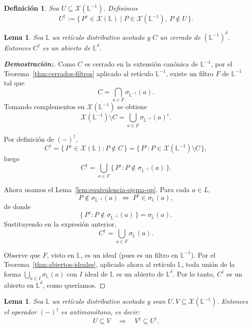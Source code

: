 \documentclass[12pt]{book}
\newtheorem{lemma}[theorem]{Lema}
\newtheorem{definition}[theorem]{Definición}
\begin{document}
\begin{definition}\label{def:operador-dagger}
Sea $U\subseteq\mathcal X(\mathbb L^{-1})$. 
Definimos
\[
U^{\dagger}
:= 
\{\,P^{c}\in\mathcal X(\mathbb L)\mid 
P\in\mathcal X(\mathbb L^{-1}),\ P\notin U\,\}.
\]
\end{definition}

\begin{lemma}
Sea $\mathbb L$ un retículo distributivo acotado y
$C$ un cerrado de $(\mathbb{L}^{-1})^\delta$.
Entonces $C^{\dagger}$ es un abierto de $\mathbb{L}^\delta$.
\end{lemma}

\begin{proof}[\textbf{Demostración:}]
Como $C$ es cerrado en la extensión canónica de $\mathbb L^{-1}$,
por el Teorema~\ref{thm:cerrados-filtros} aplicado al retículo
$\mathbb L^{-1}$, existe un filtro $F$ de $\mathbb L^{-1}$ tal que
\[
C
=
\bigcap_{a\in F}\sigma_{\mathbb L^{-1}}(a).
\]
Tomando complementos en $\mathcal X(\mathbb L^{-1})$ se obtiene
\[
\mathcal X(\mathbb L^{-1})\setminus C
=
\bigcup_{a\in F}\sigma_{\mathbb L^{-1}}(a)^{c}.
\]

Por definición de $(-)^{\dagger}$,
\[
C^{\dagger}
=
\{\,P^{c}\in\mathcal X(\mathbb L) : P\notin C\,\}
=
\{\,P^{c} : P\in\mathcal X(\mathbb L^{-1})\setminus C\,\},
\]
luego
\[
C^{\dagger}
=
\bigcup_{a\in F}\{\,P^{c} : P\notin\sigma_{\mathbb L^{-1}}(a)\,\}.
\]

Ahora usamos el Lema~\ref{lem:equivalencia-sigma-op}. Para cada $a\in L$,
\[
P\notin\sigma_{\mathbb L^{-1}}(a)
\;\Longleftrightarrow\;
P^{c}\in\sigma_{\mathbb L}(a),
\]
de donde
\[
\{\,P^{c} : P\notin\sigma_{\mathbb L^{-1}}(a)\,\}
=
\sigma_{\mathbb L}(a).
\]
Sustituyendo en la expresión anterior,
\[
C^{\dagger}
=
\bigcup_{a\in F}\sigma_{\mathbb L}(a).
\]

Observe que $F$, visto en $\mathbb L$, es un ideal
(pues es un filtro en $\mathbb L^{-1}$). Por el
Teorema~\ref{thm:abiertos-ideales}, aplicado ahora al retículo
$\mathbb L$, toda unión de la forma
$\bigcup_{a\in I}\sigma_{\mathbb L}(a)$ con $I$ ideal de $\mathbb L$
es un abierto de $\mathbb L^{\delta}$. Por lo tanto,
$C^{\dagger}$ es un abierto en $\mathbb{L}^\delta$, como queríamos.
\end{proof}



\begin{lemma}\label{lem:dagger-antimonotono}
Sea $\mathbb L$ un retículo distributivo acotado y sean 
$U,V\subseteq\mathcal X(\mathbb L^{-1})$.  
Entonces el operador $(-)^{\dagger}$ es antimonótono, es decir:
\[
U \subseteq V 
\quad\Longrightarrow\quad 
V^{\dagger} \subseteq U^{\dagger}.
\]
\end{lemma}
\end{document}
